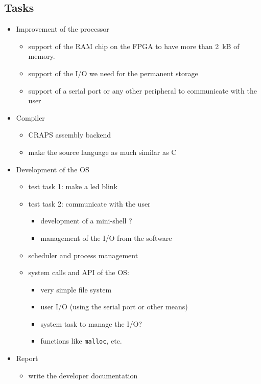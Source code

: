 \documentclass{article}
\begin{document}
\begin{appendix}
      \section{Tasks}
      \begin{itemize}
        \item Improvement of the processor
          \begin{itemize}
            \item support of the RAM chip on the FPGA to have more than
              \SI{2}{kB} of memory.
            \item support of the I/O we need for the permanent storage
            \item support of a serial port or any other peripheral to
              communicate with the user
          \end{itemize}
        \item Compiler
          \begin{itemize}
            \item CRAPS assembly backend
            \item make the source language as much similar as C
          \end{itemize}
          \item Development of the OS
            \begin{itemize}
              \item test task 1: make a led blink
              \item test task 2: communicate with the user
                \begin{itemize}
                  \item development of a mini-shell ?
                  \item management of the I/O from the software
                \end{itemize}
              \item scheduler and process management
              \item system calls and API of the OS:
                \begin{itemize}
                  \item very simple file system
                  \item user I/O (using the serial port or other means)
                  \item system task to manage the I/O?
                  \item functions like \verb+malloc+, etc.
                \end{itemize}
            \end{itemize}
        \item Report
          \begin{itemize}
            \item write the developer documentation
          \end{itemize}
      \end{itemize}
  \end{appendix}
\end{document}
